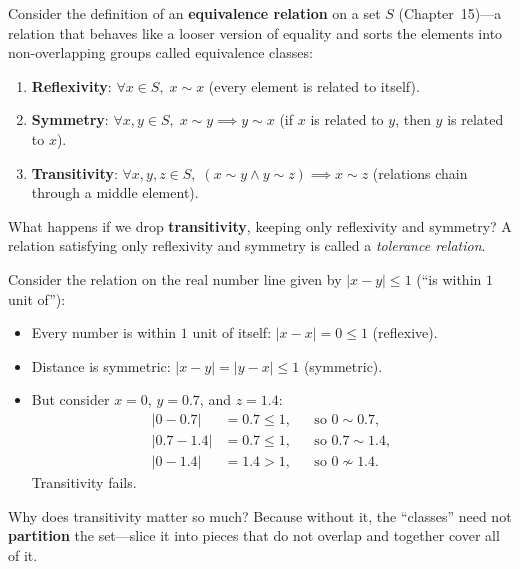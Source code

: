 \begin{example}
Consider the definition of an \textbf{equivalence relation} on a set $S$ (Chapter~15)---a relation that behaves like a looser version of equality and sorts the elements into non-overlapping groups called equivalence classes:
\begin{enumerate}
\item \textbf{Reflexivity}: $\forall x \in S, \; x \sim x$ (every element is related to itself).
\item \textbf{Symmetry}: $\forall x, y \in S, \; x \sim y \implies y \sim x$ (if $x$ is related to $y$, then $y$ is related to $x$).
\item \textbf{Transitivity}: $\forall x, y, z \in S, \; (x \sim y \land y \sim z) \implies x \sim z$ (relations chain through a middle element).
\end{enumerate}

What happens if we drop \textbf{transitivity}, keeping only reflexivity and symmetry? A relation satisfying only reflexivity and symmetry is called a \emph{tolerance relation}.

Consider the relation on the real number line given by $|x - y| \le 1$ (``is within $1$ unit of''):
\begin{itemize}
\item Every number is within $1$ unit of itself: $|x - x| = 0 \le 1$ (reflexive).
\item Distance is symmetric: $|x - y| = |y - x| \le 1$ (symmetric).
\item But consider $x = 0$, $y = 0.7$, and $z = 1.4$:
\begin{align*}
|0 - 0.7| &= 0.7 \le 1, && \text{so } 0 \sim 0.7,\\
|0.7 - 1.4| &= 0.7 \le 1, && \text{so } 0.7 \sim 1.4,\\
|0 - 1.4| &= 1.4 > 1, && \text{so } 0 \not\sim 1.4.
\end{align*}
Transitivity fails.
\end{itemize}

Why does transitivity matter so much? Because without it, the ``classes'' need not \textbf{partition} the set---slice it into pieces that do not overlap and together cover all of it.


\end{example}
